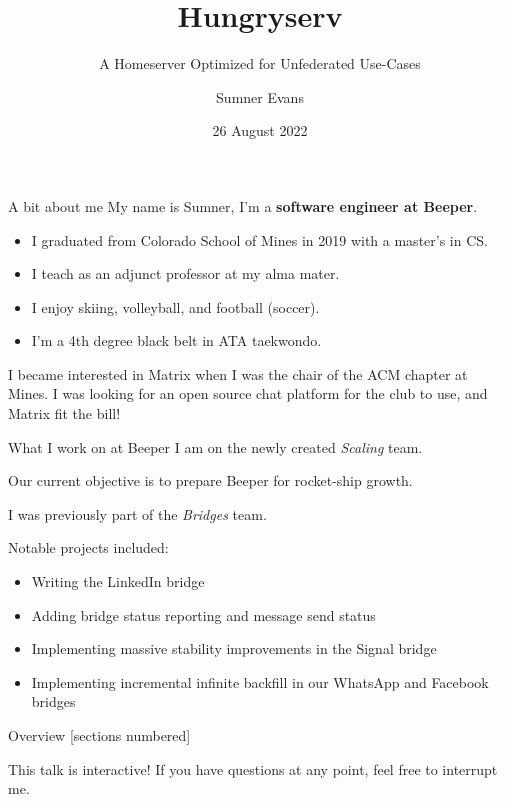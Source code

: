 \documentclass{beeper}
\title{Hungryserv}
\subtitle{A Homeserver Optimized for Unfederated Use-Cases}
\author{Sumner Evans}
\institute{Beeper}
\date{26 August 2022}
\begin{document}
\begin{frame}{A bit about me}
    My name is Sumner, I'm a \textbf{software engineer at Beeper}.
    \begin{itemize}
        \item I graduated from Colorado School of Mines in 2019 with a master's
            in CS.
        \item I teach as an adjunct professor at my alma mater.
        \item I enjoy skiing, volleyball, and football (soccer).
        \item I'm a 4th degree black belt in ATA taekwondo.
    \end{itemize}
    \pause

    I became interested in Matrix when I was the chair of the ACM chapter at
    Mines. I was looking for an open source chat platform for the club to use,
    and Matrix fit the bill!
\end{frame}

\begin{frame}{What I work on at Beeper}
    I am on the newly created \textit{Scaling} team.

    Our current objective is to prepare Beeper for rocket-ship growth.
    \vspace{0.5cm}
    \pause

    I was previously part of the \textit{Bridges} team. 

    Notable projects included:
    \begin{itemize}
        \item Writing the LinkedIn bridge
        \item Adding bridge status reporting and message send status
        \item Implementing massive stability improvements in the Signal bridge
        \item Implementing incremental infinite backfill in our WhatsApp and
            Facebook bridges
    \end{itemize}
\end{frame}

\begin{frame}{Overview}
    [sections numbered]
    \tableofcontents[hideallsubsections]

    \begin{block}{This talk is interactive!}
        If you have questions at any point, feel free to interrupt me.
    \end{block}
\end{frame}
\end{document}
